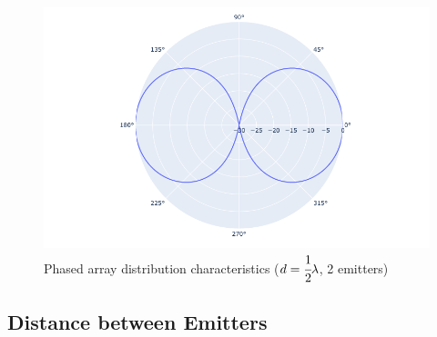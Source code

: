 \begin{figure}
  \centering
  \includegraphics[height=\mediumheight]{src/assets/pictures/theory/beam_n2_d0.5.png}
  \caption{Phased array distribution characteristics ($d = \cfrac{1}{2}\lambda$, 2 emitters)}\label{fig:theory:beam:n2_d.5}
\end{figure}

\subsection{Distance between Emitters}

